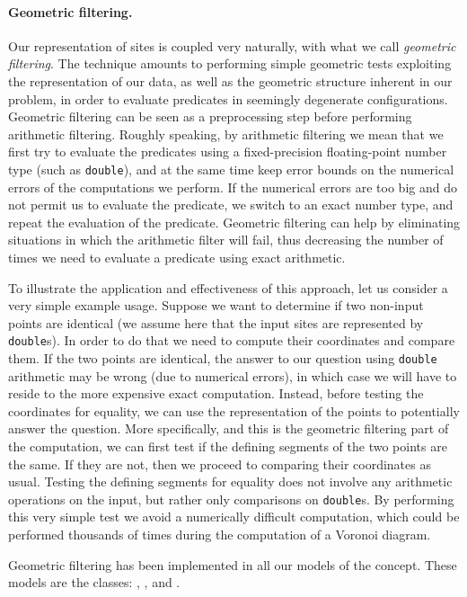 \paragraph{Geometric filtering.}
Our representation of sites is coupled very naturally, with what we
call {\em geometric filtering}. The technique
amounts to performing simple geometric tests exploiting the
representation of our data, as well as the geometric structure
inherent in our problem, in order to evaluate predicates in seemingly
degenerate configurations. Geometric filtering can be seen as a
preprocessing step before performing arithmetic filtering.
Roughly speaking, by arithmetic filtering we mean that we first try to
evaluate the predicates using a fixed-precision floating-point number
type (such as {\tt double}), and at the same time keep error bounds on
the numerical errors of the computations we perform. If the numerical
errors are too big and do not permit us to evaluate the predicate, we
switch to an exact number type, and repeat the evaluation of the
predicate. Geometric filtering can help by eliminating situations in
which the arithmetic filter will fail, thus decreasing the number
of times we need to evaluate a predicate using exact arithmetic.

To illustrate the application and effectiveness of this approach,
let us consider a very simple example usage.
Suppose we want to determine if two non-input points are
identical (we assume here that the input sites are represented by
{\tt double}s). In order to do that we need to compute their
coordinates and compare them. If the two points are identical, the
answer to our question using {\tt double} arithmetic may be 
wrong (due to numerical errors), in which case we will have to reside
to the more expensive exact computation. Instead, before testing the
coordinates for equality, we can use the representation of the points
to potentially answer the question. More specifically, and this is the
geometric filtering part of the computation, we can first
test if the defining segments of the two points are the same. If they
are not, then we proceed to comparing their coordinates as
usual. Testing the defining segments for equality does not involve any
arithmetic operations on the input, but rather only comparisons on
{\tt double}s. By performing this very simple test we avoid a
numerically difficult computation, which could be performed
thousands of times during the computation of a Voronoi diagram.

Geometric filtering has been implemented in all our models of the
 concept. These models are the
classes:
,
,
 and
.



